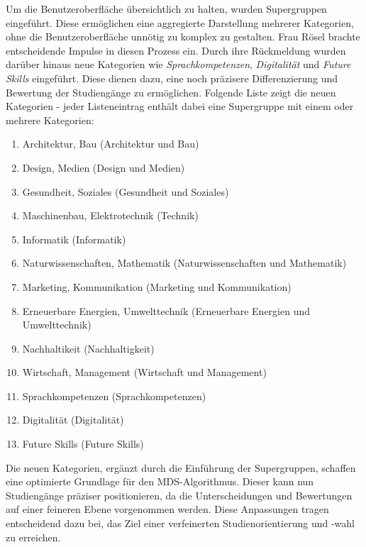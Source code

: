 Um die Benutzeroberfläche übersichtlich zu halten, wurden Supergruppen
eingeführt. Diese ermöglichen eine aggregierte Darstellung mehrerer Kategorien,
ohne die Benutzeroberfläche unnötig zu komplex zu gestalten. Frau Rösel brachte
entscheidende Impulse in diesen Prozess ein. Durch ihre Rückmeldung wurden
darüber hinaus neue Kategorien wie \textit{Sprachkompetenzen},
\textit{Digitalität} und \textit{Future Skills} eingeführt. Diese dienen dazu,
eine noch präzisere Differenzierung und Bewertung der Studiengänge zu
ermöglichen. Folgende Liste zeigt die neuen Kategorien - jeder Listeneintrag
enthält dabei eine Supergruppe mit einem oder mehrere Kategorien:

\begin{enumerate}
    \item Architektur, Bau (Architektur und Bau)
    \item Design, Medien (Design und Medien)
    \item Gesundheit, Soziales (Gesundheit und Soziales)
    \item Maschinenbau, Elektrotechnik (Technik)
    \item Informatik (Informatik)
    \item Naturwissenschaften, Mathematik (Naturwissenschaften und Mathematik)
    \item Marketing, Kommunikation (Marketing und Kommunikation)
    \item Erneuerbare Energien, Umwelttechnik (Erneuerbare Energien und
    Umwelttechnik)
    \item Nachhaltikeit (Nachhaltigkeit)
    \item Wirtschaft, Management (Wirtschaft und Management)
    \item Sprachkompetenzen (Sprachkompetenzen)
    \item Digitalität (Digitalität)
    \item Future Skills (Future Skills)
\end{enumerate}

Die neuen Kategorien, ergänzt durch die Einführung der Supergruppen, schaffen
eine optimierte Grundlage für den MDS-Algorithmus. Dieser kann nun Studiengänge
präziser positionieren, da die Unterscheidungen und Bewertungen auf einer
feineren Ebene vorgenommen werden. Diese Anpassungen tragen entscheidend dazu
bei, das Ziel einer verfeinerten Studienorientierung und -wahl zu erreichen.
